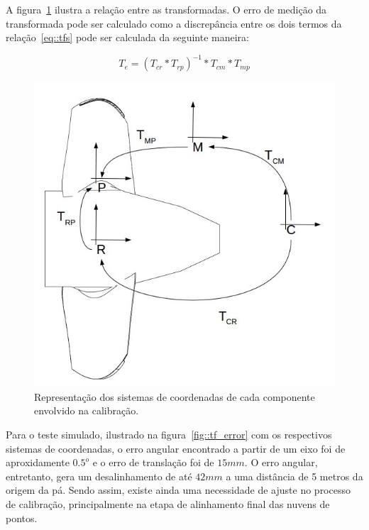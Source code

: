A figura~\ref{fig::tfs} ilustra a relação entre as transformadas. O erro de
medição da transformada pode ser calculado como a discrepância entre os dois
termos da relação~\ref{eq::tfs} pode ser calculada da seguinte maneira:

$$T_e = (T_{cr}*T_{rp})^{-1}*T_{cm}*T_{mp}$$

\begin{figure}[h!]
	\centering
	\includegraphics[width=0.7\columnwidth]{method/figs/calibracao/tfs}
	\caption{Representação dos sistemas de coordenadas de cada componente
	envolvido na calibração.}
    \label{fig::tfs}
\end{figure}
	

Para o teste simulado, ilustrado na figura~\ref{fig::tf_error} com os
respectivos sistemas de coordenadas, o erro angular encontrado a partir de um
eixo foi de aproxidamente $0.5^o$ e o erro de translação foi de $15mm$. 
O erro angular, entretanto, gera um desalinhamento de até $42mm$ a uma distância
de 5 metros da origem da pá. Sendo assim, existe ainda uma necessidade de ajuste
no processo de calibração, principalmente na etapa de alinhamento final das
nuvens de pontos.

